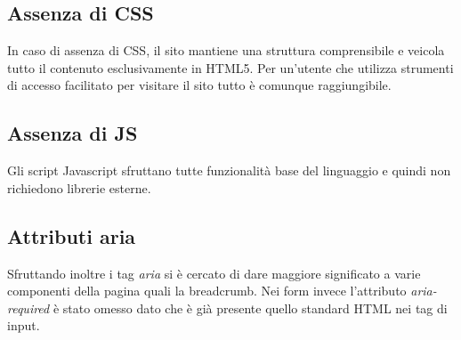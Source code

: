 \subsection{Assenza di CSS}
In caso di assenza di CSS, il sito mantiene una struttura comprensibile e veicola tutto il contenuto esclusivamente in HTML5. Per un'utente che utilizza strumenti di accesso facilitato per visitare il sito tutto è comunque raggiungibile.

\subsection{Assenza di JS}
Gli script Javascript sfruttano tutte funzionalità base del linguaggio e quindi non richiedono librerie esterne.

\subsection{Attributi aria}
Sfruttando inoltre i tag \textit{aria} si è cercato di dare maggiore significato a varie componenti della pagina quali la breadcrumb. Nei form invece l'attributo \textit{aria-required} è stato omesso dato che è già presente quello standard HTML nei tag di input.